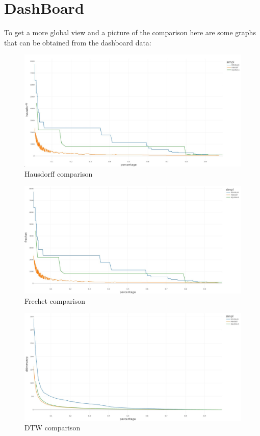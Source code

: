 \section{DashBoard}

To get a more global view and a picture of the comparison here are some graphs that can be obtained from the dashboard data: 


\begin{figure}[!h]
	\centering
	\includegraphics[width=1\linewidth]{figures/Stats/hausdorff_comp.jpg}
	\caption{Hausdorff comparison}
	\label{fig:comp_h}
\end{figure}


\begin{figure}[!h]
	\centering
	\includegraphics[width=1\linewidth]{figures/Stats/frechet_comp.jpg}
	\caption{Frechet comparison}
	\label{fig:comp_f}
\end{figure}


\begin{figure}[!h]
	\centering
	\includegraphics[width=1\linewidth]{figures/Stats/dtw_comp.jpg}
	\caption{DTW comparison}
	\label{fig:comp_dt}
\end{figure}


